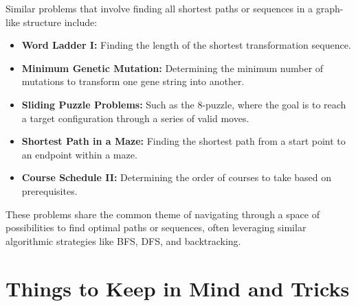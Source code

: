 Similar problems that involve finding all shortest paths or sequences in a graph-like structure include:

\begin{itemize}
    \item \textbf{Word Ladder I:} Finding the length of the shortest transformation sequence.
    
    \item \textbf{Minimum Genetic Mutation:} Determining the minimum number of mutations to transform one gene string into another.
    
    \item \textbf{Sliding Puzzle Problems:} Such as the 8-puzzle, where the goal is to reach a target configuration through a series of valid moves.
    
    \item \textbf{Shortest Path in a Maze:} Finding the shortest path from a start point to an endpoint within a maze.
    
    \item \textbf{Course Schedule II:} Determining the order of courses to take based on prerequisites.
\end{itemize}

These problems share the common theme of navigating through a space of possibilities to find optimal paths or sequences, often leveraging similar algorithmic strategies like BFS, DFS, and backtracking.

\section*{Things to Keep in Mind and Tricks}

